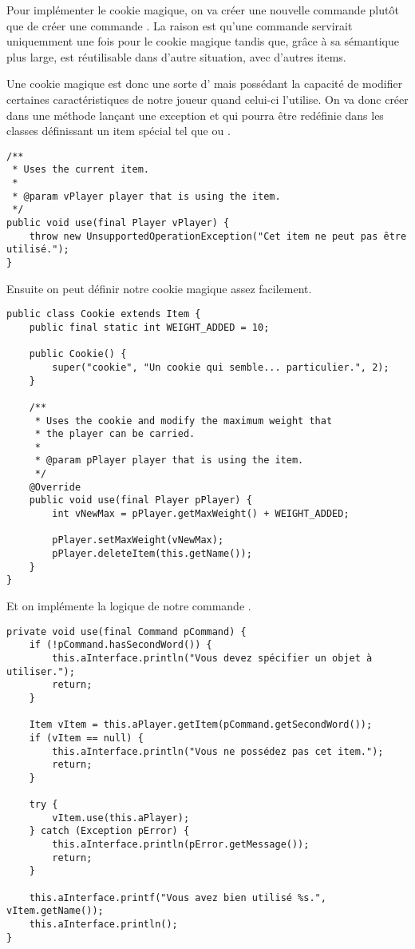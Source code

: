 \begin{exercise}[subtitle=Cookie magique]

Pour implémenter le cookie magique, on va créer une nouvelle commande  plutôt que de créer une commande . La raison est qu'une commande  servirait uniquemment une fois pour le cookie magique tandis que, grâce à sa sémantique plus large,  est réutilisable dans d'autre situation, avec d'autres items.

Une cookie magique est donc une sorte d' mais possédant la capacité de modifier certaines caractéristiques de notre joueur quand celui-ci l'utilise. On va donc créer dans  une méthode  lançant une exception et qui pourra être redéfinie dans les classes définissant un item spécial tel que  ou .

\begin{verbatim}
/**
 * Uses the current item.
 *
 * @param vPlayer player that is using the item.
 */
public void use(final Player vPlayer) {
    throw new UnsupportedOperationException("Cet item ne peut pas être utilisé.");
}
\end{verbatim}

Ensuite on peut définir notre cookie magique assez facilement.

\begin{verbatim}
public class Cookie extends Item {
    public final static int WEIGHT_ADDED = 10;

    public Cookie() {
        super("cookie", "Un cookie qui semble... particulier.", 2);
    }

    /**
     * Uses the cookie and modify the maximum weight that
     * the player can be carried.
     *
     * @param pPlayer player that is using the item.
     */
    @Override
    public void use(final Player pPlayer) {
        int vNewMax = pPlayer.getMaxWeight() + WEIGHT_ADDED;

        pPlayer.setMaxWeight(vNewMax);
        pPlayer.deleteItem(this.getName());
    }
}
\end{verbatim}

Et on implémente la logique de notre commande .

\begin{verbatim}
private void use(final Command pCommand) {
    if (!pCommand.hasSecondWord()) {
        this.aInterface.println("Vous devez spécifier un objet à utiliser.");
        return;
    }

    Item vItem = this.aPlayer.getItem(pCommand.getSecondWord());
    if (vItem == null) {
        this.aInterface.println("Vous ne possédez pas cet item.");
        return;
    }

    try {
        vItem.use(this.aPlayer);
    } catch (Exception pError) {
        this.aInterface.println(pError.getMessage());
        return;
    }

    this.aInterface.printf("Vous avez bien utilisé %s.", vItem.getName());
    this.aInterface.println();
}
\end{verbatim}
\end{exercise}

